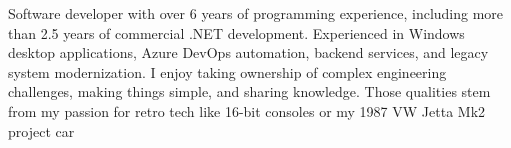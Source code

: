 \documentclass[9pt]{developercv} %
\begin{document}
\begin{minipage}[t]{\textwidth} %
	\vspace{-\baselineskip} 
	
	Software developer with over 6 years of programming experience, including more than 2.5 years of commercial .NET development. 
	Experienced in Windows desktop applications, Azure DevOps automation, backend services, and legacy system modernization. 
	I enjoy taking ownership of complex engineering challenges, making things simple, and sharing knowledge. 
	Those qualities stem from my passion for retro tech like 16-bit consoles or my 1987 VW Jetta Mk2 project car

	\end{minipage}
\hfill %


\newcommand{\location}[1]{
	\small\textit{#1}
}

\end{document}
